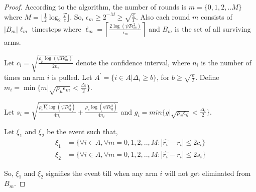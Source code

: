 \begin{proof}
According to the algorithm, the number of rounds is $m=\lbrace 0,1,2,.. M\rbrace $ where $M=\bigg\lfloor \frac{1}{2}\log_{2} \frac{T}{e}\bigg\rfloor$. So, $\epsilon_{m}\geq 2^{-M}\geq \sqrt{\frac{e}{T}}$. Also each round $m$ consists of $|B_{m}|\ell_{m}$ timesteps where $\ell_{m} = \left\lceil\frac{2\log(\psi T \epsilon_{m}^{2})}{\epsilon_{m}}\right\rceil$ and $B_{m}$ is the set of all surviving arms. 

Let $c_{i} = \sqrt{\frac{\rho_{\mu}\log{(\psi T\epsilon_{m}^{2})}}{2 n_{i}}}$ denote the confidence interval, where $n_{i}$ is the number of times an arm $i$ is pulled. Let $A^{'}=\lbrace i\in A|\Delta_{i}\geq b\rbrace$, for $b\geq \sqrt{\frac{e}{T}}$. Define $m_{i}=\min\lbrace m| \sqrt{\rho_{\mu}\epsilon_{m}}<\frac{\Delta_{i}}{2}\rbrace$.

Let $s_{i}=\sqrt{\frac{\rho_v \hat{V_{i}} \log{(\psi T\epsilon_{g}^{2})}}{4 n_{i}} + \frac{\rho_v \log{(\psi T\epsilon_{g}^{2})}}{4 n_{i}}}$ and 
$g_{i}=min\lbrace g| \sqrt{\rho_{v}\epsilon_{g}}<\frac{\Delta_{i}}{2}\rbrace$. 


Let $\xi_{1}$ and $\xi_{2}$ be the event such that,
\begin{align*}
\xi_{1}&=\bigg\lbrace \forall i\in A, \forall m=0,1,2,..,M: |\hat{r_i} - r_i| \leq 2c_i\bigg\rbrace\\
\xi_{2}&=\bigg\lbrace \forall i\in A, \forall m=0,1,2,..,M: |\hat{r_i} - r_i| \leq  2s_i\bigg\rbrace
\end{align*}

So, $\xi_{1}$ and $\xi_{2}$ signifies the event till when any arm $i$ will not get eliminated from $B_m$.




\end{proof}
